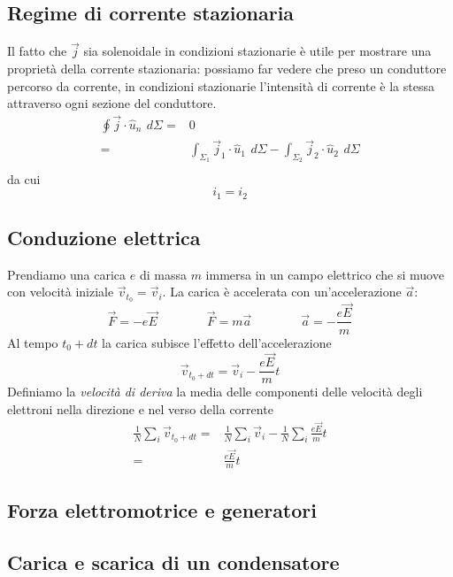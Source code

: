 \documentclass[x11names]{report}
\begin{document}
\subsection{Regime di corrente stazionaria}
Il fatto che \(\vec{j}\) sia solenoidale in condizioni stazionarie è utile per mostrare una proprietà della corrente stazionaria: possiamo far vedere che preso un conduttore percorso da corrente, in condizioni stazionarie l'intensità di corrente è la stessa attraverso ogni sezione del conduttore.
\begin{align*}
	\oint \vec{j}\cdot \hat{u}_n \,\ d\Sigma =& 0 \\
	=& \int_{\Sigma_1}\vec{j}_1\cdot \hat{u}_1 \,\ d\Sigma - \int_{\Sigma_2}\vec{j}_2\cdot \hat{u}_2 \,\ d\Sigma \\
\end{align*}
da cui
\[
i_1 = i_2
\]
\subsection{Conduzione elettrica}
Prendiamo una carica \(e\) di massa \(m\) immersa in un campo elettrico che si muove con velocità iniziale \(\vec{v}_{t_0} = \vec{v}_i\). La carica è accelerata con un'accelerazione \(\vec{a}\):
\[
\vec{F} = -e\vec{E} \qquad \qquad \vec{F} = m \vec{a} \qquad \qquad \vec{a} = -\frac{e\vec{E}}{m}
\]
Al tempo \(t_0 + dt\) la carica subisce l'effetto dell'accelerazione
\[
\vec{v}_{t_0+dt} = \vec{v}_i -\frac{e\vec{E}}{m}t
\]
Definiamo la \textit{velocità di deriva} la media delle componenti delle velocità degli elettroni nella direzione e nel verso della corrente
\begin{align*}
	\frac{1}{N}\sum_i \vec{v}_{t_0 + dt} =& \frac{1}{N}\sum_i \vec{v}_i - \frac{1}{N}\sum_i\frac{e\vec{E}}{m}t \\
	=& \frac{e\vec{E}}{m}t
\end{align*}
\begin{center}
	\textcolor{red}{}
\end{center}


\subsection{Forza elettromotrice e generatori}
\subsection{Carica e scarica di un condensatore}
\end{document}
